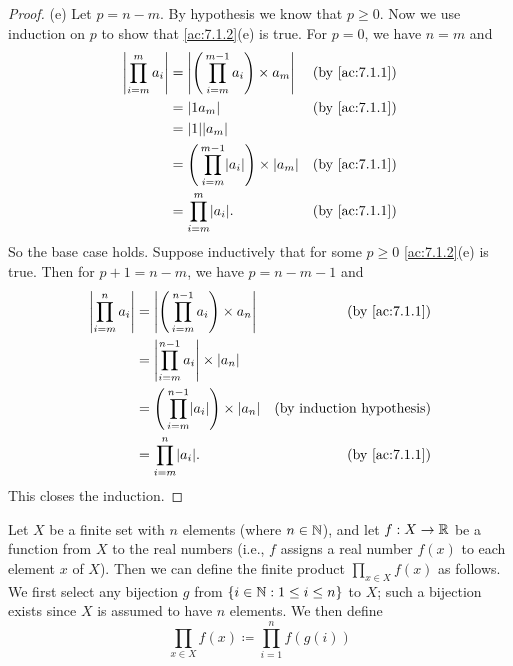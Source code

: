 \begin{proof}{(e)}
  Let \(p = n - m\).
  By hypothesis we know that \(p \geq 0\).
  Now we use induction on \(p\) to show that \cref{ac:7.1.2}(e) is true.
  For \(p = 0\), we have \(n = m\) and
  \begin{align*}
    \abs{\prod_{i = m}^m a_i} & = \abs{\Bigg(\prod_{i = m}^{m - 1} a_i\Bigg) \times a_m}       & \text{(by \cref{ac:7.1.1})} \\
                              & = \abs{1a_m}                                                   & \text{(by \cref{ac:7.1.1})} \\
                              & = \abs{1}\abs{a_m}                                                                           \\
                              & = \Bigg(\prod_{i = m}^{m - 1} \abs{a_i}\Bigg) \times \abs{a_m} & \text{(by \cref{ac:7.1.1})} \\
                              & = \prod_{i = m}^m \abs{a_i}.                                   & \text{(by \cref{ac:7.1.1})}
  \end{align*}
  So the base case holds.
  Suppose inductively that for some \(p \geq 0\) \cref{ac:7.1.2}(e) is true.
  Then for \(p + 1 = n - m\), we have \(p = n - m - 1\) and
  \begin{align*}
    \abs{\prod_{i = m}^n a_i} & = \abs{\Bigg(\prod_{i = m}^{n - 1} a_i\Bigg) \times a_n}       & \text{(by \cref{ac:7.1.1})}      \\
                              & = \abs{\prod_{i = m}^{n - 1} a_i} \times \abs{a_n}                                                \\
                              & = \Bigg(\prod_{i = m}^{n - 1} \abs{a_i}\Bigg) \times \abs{a_n} & \text{(by induction hypothesis)} \\
                              & = \prod_{i = m}^n \abs{a_i}.                                   & \text{(by \cref{ac:7.1.1})}
  \end{align*}
  This closes the induction.
\end{proof}

\begin{ac}\label{ac:7.1.3}
  Let \(X\) be a finite set with \(n\) elements (where \(n \in \mathbb{N}\)), and let \(f : X \to \mathbb{R}\) be a function from \(X\) to the real numbers
  (i.e., \(f\) assigns a real number \(f(x)\) to each element \(x\) of \(X\)).
  Then we can define the finite product \(\prod_{x \in X} f(x)\) as follows.
  We first select any bijection \(g\) from \(\{i \in \mathbb{N} : 1 \leq i \leq n\}\) to \(X\);
  such a bijection exists since \(X\) is assumed to have \(n\) elements.
  We then define
  \[
    \prod_{x \in X} f(x) \coloneqq \prod_{i = 1}^n f(g(i))
  \]
\end{ac}

